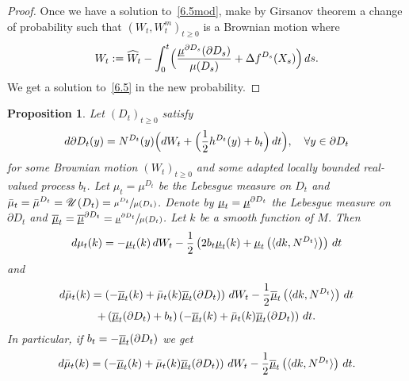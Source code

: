 \documentclass[10pt]{amsart}
\theoremstyle{plain}
\newtheorem{prop}[thm]{Proposition}
\theoremstyle{definition}
\newcommand{\SU}{{\mathscr U}}
\newcommand{\usm}{{\underline{\smash{\mu}}}}
\newcommand{\usbm}{{\underline{\smash{\overline\mu}}}}
\let\di\displaystyle
\let\f\frac
\begin{document}
\begin{proof}
Once we have a solution to~\eqref{6.5mod}, make by Girsanov theorem a change of probability such that $(W_t,W_t^m)_{t\geq 0}$ is a Brownian motion where
\begin{equation}
W_t:=\widehat W_t-\int_0^t \Bigl(\f{\usm^{\partial D_s}(\partial D_s)}{\mu(D_s)}+\Delta f^{D_s}(X_s) \Bigr)\, ds.
\end{equation}
We get a solution to~\eqref{6.5} in the new probability.
\end{proof}

\begin{prop}
\label{P4.5}
Let $(D_t)_{t\geq 0}$ satisfy
\begin{equation}
d\partial D_t(y)=N^{D_t}(y) \Bigl(dW_t+ \Bigl(\f12 h^{D_t}(y)+b_t \Bigr)\,dt \Bigr),\quad \forall y\in \partial D_t
\end{equation}
for some Brownian motion $(W_t)_{t\geq 0}$ and some adapted locally bounded real-valued process $b_t$.
Let $\mu_t=\mu^{D_t}$ be the Lebesgue measure on $D_t$ and $\di \bar\mu_t=\bar \mu^{D_t}=\SU(D_{t})=\sfrac{\mu^{D_t}}{\mu(D_t)}$. Denote by $\usm_t=\usm^{\partial D_t}$ the Lebesgue measure on $\partial D_t$ and $\di \usbm_t=\usbm^{\partial D_t}=\sfrac{\usm^{\partial D_t}}{\mu(D_t)}$.
Let $k$ be a smooth function of $M$. Then
\begin{equation}
\label{4.9.1}
d\mu_t(k)=-{\usm}_t(k)\,dW_t-\f12 \left(2b_t\usm_t(k)+{\usm}_t\left(\langle dk,N^{D_t}\rangle \right)\right)\,dt
\end{equation}
and
\begin{multline}
\label{4.9.2}
d\bar\mu_t(k)=\left(-\usbm_t(k)+\bar\mu_t(k)\usbm_t(\partial D_t)\right)\,dW_t-\f12 \usbm_t\left(\langle dk,N^{D_t}\rangle \right)\,dt\\
+\left(\usbm_t(\partial D_t)+b_t\right)\left(-\usbm_t(k)+\bar\mu_t(k)\usbm_t(\partial D_t)\right)\,dt.
\end{multline}
In particular, if $b_t=-\usbm_t(\partial D_t)$ we get
\begin{equation}
\label{4.9}
d\bar\mu_t(k)=\left(-\usbm_t(k)+\bar\mu_t(k)\usbm_t(\partial D_t)\right)\,dW_t-\f12 \usbm_t\left(\langle dk,N^{D_t}\rangle \right)\,dt.
\end{equation}
\end{prop}
\end{document}
